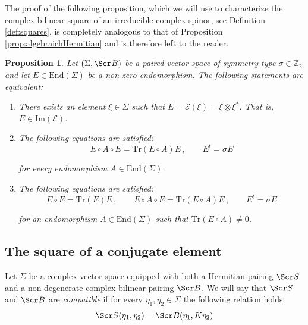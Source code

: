 \documentclass[10pt,a4paper,twoside,reqno]{amsart}
\theoremstyle{plain}
\newtheorem{prop}[thm]{Proposition}
\theoremstyle{definition}
\theoremstyle{remark}
\newcommand{\End}{\mathrm{End}}
\def\Z{\mathbb{Z}}
\newcommand{\Tr}{\mathrm{Tr}}
\def\scB{\Scr B}
\def\scS{\Scr S}
\def\cE{\mathcal{E}}
\def\Im{\mathrm{Im}}
\begin{document}
\noindent
The proof of the following proposition, which we will use to characterize the complex-bilinear square of an irreducible complex spinor, see Definition \ref{def:squares}, is completely analogous to that of Proposition \ref{prop:algebraichHermitian} and is therefore left to the reader.
\begin{prop}
\label{prop:algebraichbilinear}
Let $(\Sigma,\scB)$ be a paired vector space of symmetry type $\sigma\in\Z_2$ and let $E\in \End(\Sigma)$ be a non-zero endomorphism. The following statements are equivalent:   

\begin{enumerate}
\item[\normalfont(a)] There exists an element $\xi\in \Sigma$ such that $E = \cE(\xi) = \xi \otimes \xi^{\ast}$. That is, $E\in \Im (\cE)$.

\item[\normalfont(b)]  The following equations are satisfied:
\begin{equation*}
E \circ A \circ E=\Tr(E\circ A)E\, , \qquad E^t=\sigma E
\end{equation*}

\noindent
for every endomorphism $A\in \End(\Sigma)$.

\item[\normalfont(c)]  The following equations are satisfied:
\begin{equation*}
E\circ E=\Tr(E)E\, , \qquad E \circ A \circ E=\Tr(E\circ A)E\, , \qquad E^t=\sigma E
\end{equation*}

\noindent
for an endomorphism $A\in\End(\Sigma)$ such that $\Tr(E\circ A)\neq 0$.
\end{enumerate}
\end{prop}
 

\subsection{The square of a conjugate element}
\label{sec:conjugatevector}


Let $\Sigma$ be a complex vector space equipped with both a Hermitian pairing $\scS$ and a non-degenerate complex-bilinear pairing $\scB$. We will say that $\scS$ and $\scB$ are \emph{compatible} if for every $\eta_1 , \eta_2 \in \Sigma$ the following relation holds:
\begin{equation*}
\scS(\eta_1 , \eta_2) = \scB(\eta_1 , K\eta_2) 
\end{equation*}
\end{document}
